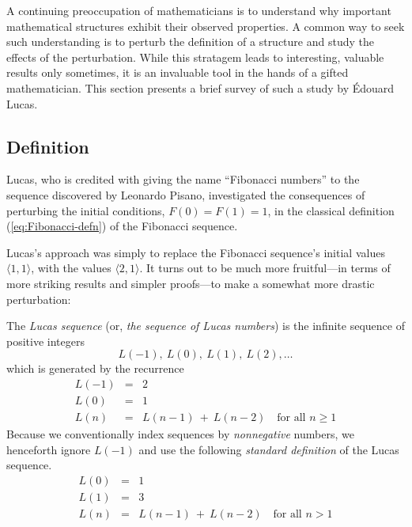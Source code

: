 
A continuing preoccupation of mathematicians is to understand why important mathematical structures exhibit their observed properties.  A common way to seek such understanding is to perturb the definition of a structure and study the effects of the perturbation.  While this stratagem leads to interesting, valuable results only sometimes, it is an invaluable tool in the hands of a gifted mathematician.  This section presents a brief survey of such a study by \'{E}douard Lucas.   

\subsection{Definition}

Lucas, who is credited with giving the name ``Fibonacci numbers'' to the sequence discovered by Leonardo Pisano, investigated the consequences of perturbing the initial conditions, $F(0) = F(1) = 1$, in the classical definition (\ref{eq:Fibonacci-defn}) of the Fibonacci sequence.

\medskip

Lucas's approach was simply to replace the Fibonacci sequence's initial values $\langle 1,1 \rangle$, with the values $\langle 2,1 \rangle$.  It turns out to be much more fruitful---in terms of more striking results and simpler proofs---to make a somewhat more drastic perturbation:

\smallskip

 

The {\it Lucas sequence} (or, {\it the sequence of Lucas numbers}) is the infinite sequence of positive integers
\[ L(-1), \ L(0), \ L(1), \ L(2), \ldots \]
which is generated by the recurrence
\begin{eqnarray}
\nonumber
L(-1) & = & 2 \\
\label{eq:Lucas-defn-1}
L(0) & = & 1 \\
\nonumber
L(n) & = & L(n-1) \ + \ L(n-2) \ \ \ \mbox{ for all } n \geq 1
\end{eqnarray}
Because we conventionally index sequences by {\em nonnegative} numbers, we henceforth ignore $L(-1)$ and use the following {\em standard definition} of the Lucas sequence.
\begin{eqnarray}
\nonumber
L(0) & = & 1 \\
\label{eq:Lucas-defn-2}
L(1) & = & 3 \\
\nonumber
L(n) & = & L(n-1) \ + \ L(n-2) \ \ \ \mbox{ for all } n > 1
\end{eqnarray}


